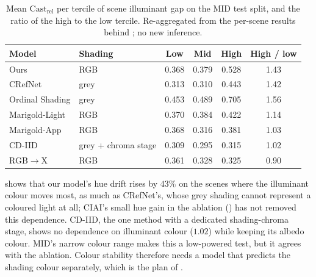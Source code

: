 \begin{table}[t!]
  \caption[Does hue drift follow illuminant colour?]{%
    Mean $\text{Cast}_{\text{rel}}$ per tercile of scene illuminant gap on the MID test
    split, and the ratio of the high to the low tercile. Re-aggregated from the per-scene
    results behind ; no new inference.
  }
  \label{tab:colour_strat}
  \centering
  \small
  \begin{tabular}{@{}llcccc@{}}
    \toprule
    Model & Shading & Low & Mid & High & High / low \\
    \midrule
    Ours               & RGB & 0.368 & 0.379 & 0.528 & 1.43 \\
    CRefNet            & grey & 0.313 & 0.310 & 0.443 & 1.42 \\
    Ordinal Shading    & grey & 0.453 & 0.489 & 0.705 & 1.56 \\
    Marigold-Light     & RGB & 0.370 & 0.384 & 0.422 & 1.14 \\
    Marigold-App       & RGB & 0.368 & 0.316 & 0.381 & 1.03 \\
    CD-IID             & grey + chroma stage & 0.309 & 0.295 & 0.315 & 1.02 \\
    RGB$\rightarrow$X  & RGB & 0.361 & 0.328 & 0.325 & 0.90 \\
    \bottomrule
  \end{tabular}
\end{table}

 shows that our model's hue drift rises by $43\%$ on the scenes where
the illuminant colour moves most, as much as CRefNet's, whose grey shading cannot represent a
coloured light at all; CIAI's small hue gain in the ablation () has not
removed this dependence. CD-IID, the one method with a dedicated shading-chroma stage, shows
no dependence on illuminant colour ($1.02$) while keeping its albedo colour. MID's narrow colour range makes this a low-powered test, but it agrees with the
ablation. Colour stability therefore needs a model that predicts the shading colour
separately, which is the plan of .
